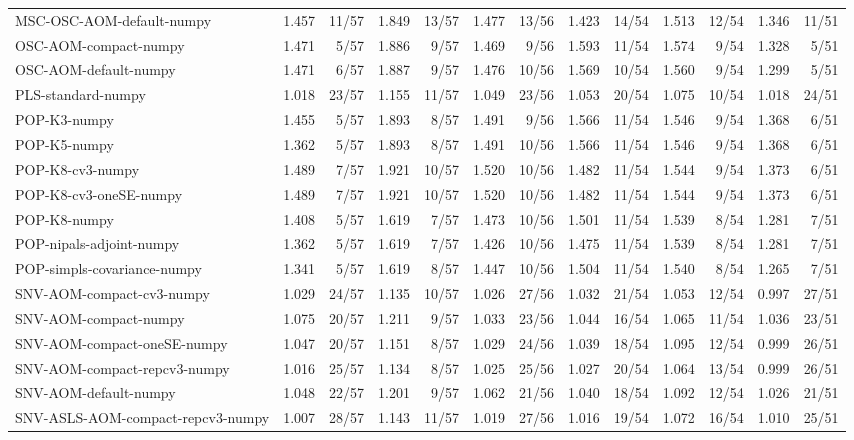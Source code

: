 \begin{tabular}{lrrrrrrrrrrrr}
MSC-OSC-AOM-default-numpy & 1.457 & 11/57 & 1.849 & 13/57 & 1.477 & 13/56 & 1.423 & 14/54 & 1.513 & 12/54 & 1.346 & 11/51 \\
OSC-AOM-compact-numpy & 1.471 & 5/57 & 1.886 & 9/57 & 1.469 & 9/56 & 1.593 & 11/54 & 1.574 & 9/54 & 1.328 & 5/51 \\
OSC-AOM-default-numpy & 1.471 & 6/57 & 1.887 & 9/57 & 1.476 & 10/56 & 1.569 & 10/54 & 1.560 & 9/54 & 1.299 & 5/51 \\
PLS-standard-numpy & 1.018 & 23/57 & 1.155 & 11/57 & 1.049 & 23/56 & 1.053 & 20/54 & 1.075 & 10/54 & 1.018 & 24/51 \\
POP-K3-numpy & 1.455 & 5/57 & 1.893 & 8/57 & 1.491 & 9/56 & 1.566 & 11/54 & 1.546 & 9/54 & 1.368 & 6/51 \\
POP-K5-numpy & 1.362 & 5/57 & 1.893 & 8/57 & 1.491 & 10/56 & 1.566 & 11/54 & 1.546 & 9/54 & 1.368 & 6/51 \\
POP-K8-cv3-numpy & 1.489 & 7/57 & 1.921 & 10/57 & 1.520 & 10/56 & 1.482 & 11/54 & 1.544 & 9/54 & 1.373 & 6/51 \\
POP-K8-cv3-oneSE-numpy & 1.489 & 7/57 & 1.921 & 10/57 & 1.520 & 10/56 & 1.482 & 11/54 & 1.544 & 9/54 & 1.373 & 6/51 \\
POP-K8-numpy & 1.408 & 5/57 & 1.619 & 7/57 & 1.473 & 10/56 & 1.501 & 11/54 & 1.539 & 8/54 & 1.281 & 7/51 \\
POP-nipals-adjoint-numpy & 1.362 & 5/57 & 1.619 & 7/57 & 1.426 & 10/56 & 1.475 & 11/54 & 1.539 & 8/54 & 1.281 & 7/51 \\
POP-simpls-covariance-numpy & 1.341 & 5/57 & 1.619 & 8/57 & 1.447 & 10/56 & 1.504 & 11/54 & 1.540 & 8/54 & 1.265 & 7/51 \\
SNV-AOM-compact-cv3-numpy & 1.029 & 24/57 & 1.135 & 10/57 & 1.026 & 27/56 & 1.032 & 21/54 & 1.053 & 12/54 & 0.997 & 27/51 \\
SNV-AOM-compact-numpy & 1.075 & 20/57 & 1.211 & 9/57 & 1.033 & 23/56 & 1.044 & 16/54 & 1.065 & 11/54 & 1.036 & 23/51 \\
SNV-AOM-compact-oneSE-numpy & 1.047 & 20/57 & 1.151 & 8/57 & 1.029 & 24/56 & 1.039 & 18/54 & 1.095 & 12/54 & 0.999 & 26/51 \\
SNV-AOM-compact-repcv3-numpy & 1.016 & 25/57 & 1.134 & 8/57 & 1.025 & 25/56 & 1.027 & 20/54 & 1.064 & 13/54 & 0.999 & 26/51 \\
SNV-AOM-default-numpy & 1.048 & 22/57 & 1.201 & 9/57 & 1.062 & 21/56 & 1.040 & 18/54 & 1.092 & 12/54 & 1.026 & 21/51 \\
SNV-ASLS-AOM-compact-repcv3-numpy & 1.007 & 28/57 & 1.143 & 11/57 & 1.019 & 27/56 & 1.016 & 19/54 & 1.072 & 16/54 & 1.010 & 25/51 \\

\end{tabular}
